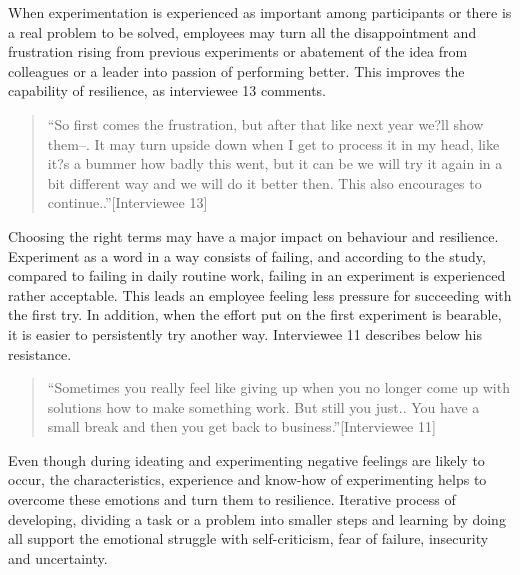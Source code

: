 When experimentation is experienced as important among participants or there is a real problem to be solved, employees may turn all the disappointment and frustration rising from previous experiments or abatement of the idea from colleagues or a leader into passion of performing better. This improves the capability of resilience, as interviewee 13 comments. 
\begin{quote}
``So first comes the frustration, but after that like next year we?ll show them--. It may turn upside down when I get to process it in my head, like it?s a bummer how badly this went, but it can be we will try it again in a bit different way and we will do it better then. This also encourages to continue..''[Interviewee 13]
\end{quote}
Choosing the right terms may have a major impact on behaviour and resilience. Experiment as a word in a way consists of failing, and according to the study, compared to failing in daily routine work, failing in an experiment is experienced rather acceptable. This leads an employee feeling less pressure for succeeding with the first try. In addition, when the effort put on the first experiment is bearable, it is easier to persistently try another way. Interviewee 11 describes below his resistance. 
\begin{quote}
``Sometimes you really feel like giving up when you no longer come up with solutions how to make something work. But still you just.. You have a small break and then you get back to business.''[Interviewee 11]
\end{quote}
Even though during ideating and experimenting negative feelings are likely to occur, the characteristics, experience and know-how of experimenting helps to overcome these emotions and turn them to resilience. Iterative process of developing, dividing a task or a problem into smaller steps and learning by doing all support the emotional struggle with self-criticism, fear of failure, insecurity and uncertainty. 

